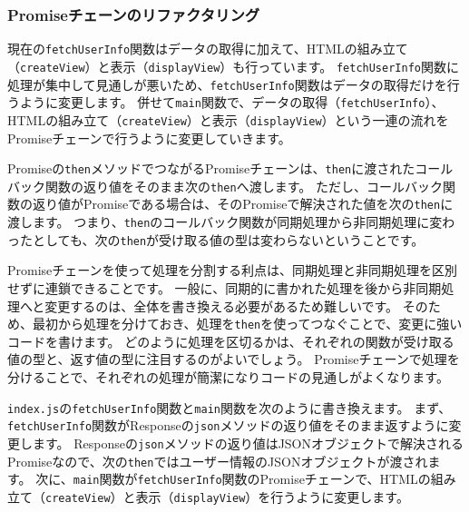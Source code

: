 \hypertarget{refactor-promise-chain}{%
\subsubsection{Promiseチェーンのリファクタリング}\label{refactor-promise-chain}}

現在の\texttt{fetchUserInfo}関数はデータの取得に加えて、HTMLの組み立て（\texttt{createView}）と表示（\texttt{displayView}）も行っています。
\texttt{fetchUserInfo}関数に処理が集中して見通しが悪いため、\texttt{fetchUserInfo}関数はデータの取得だけを行うように変更します。
併せて\texttt{main}関数で、データの取得（\texttt{fetchUserInfo}）、HTMLの組み立て（\texttt{createView}）と表示（\texttt{displayView}）という一連の流れをPromiseチェーンで行うように変更していきます。

Promiseの\texttt{then}メソッドでつながるPromiseチェーンは、\texttt{then}に渡されたコールバック関数の返り値をそのまま次の\texttt{then}へ渡します。
ただし、コールバック関数の返り値がPromiseである場合は、そのPromiseで解決された値を次の\texttt{then}に渡します。
つまり、\texttt{then}のコールバック関数が同期処理から非同期処理に変わったとしても、次の\texttt{then}が受け取る値の型は変わらないということです。

Promiseチェーンを使って処理を分割する利点は、同期処理と非同期処理を区別せずに連鎖できることです。
一般に、同期的に書かれた処理を後から非同期処理へと変更するのは、全体を書き換える必要があるため難しいです。
そのため、最初から処理を分けておき、処理を\texttt{then}を使ってつなぐことで、変更に強いコードを書けます。
どのように処理を区切るかは、それぞれの関数が受け取る値の型と、返す値の型に注目するのがよいでしょう。
Promiseチェーンで処理を分けることで、それぞれの処理が簡潔になりコードの見通しがよくなります。

\texttt{index.js}の\texttt{fetchUserInfo}関数と\texttt{main}関数を次のように書き換えます。
まず、\texttt{fetchUserInfo}関数がResponseの\texttt{json}メソッドの返り値をそのまま返すように変更します。
Responseの\texttt{json}メソッドの返り値はJSONオブジェクトで解決されるPromiseなので、次の\texttt{then}ではユーザー情報のJSONオブジェクトが渡されます。
次に、\texttt{main}関数が\texttt{fetchUserInfo}関数のPromiseチェーンで、HTMLの組み立て（\texttt{createView}）と表示（\texttt{displayView}）を行うように変更します。

